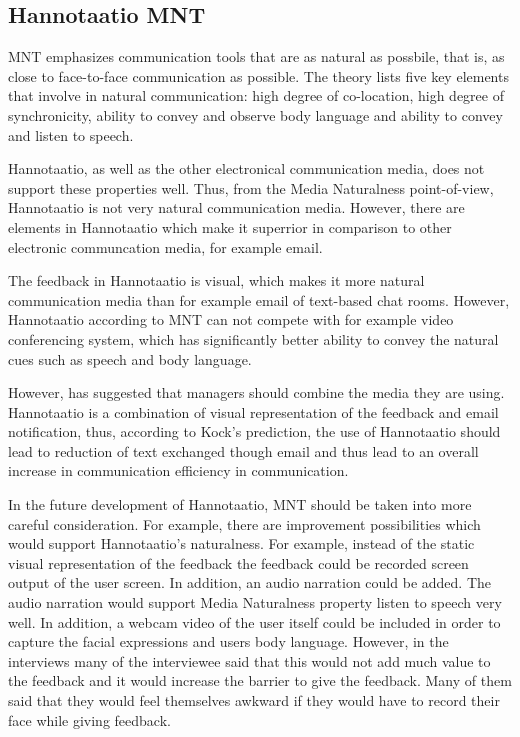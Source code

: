 \documentclass[english,12pt,a4paper,pdftex]{article}
\begin{document}
\subsection{Hannotaatio MNT}

\Ac{MNT} emphasizes communication tools that are as natural as possbile, that is, as close to face-to-face communication as possible. The theory lists five key elements that involve in natural communication: high degree of co-location, high degree of synchronicity, ability to convey and observe body language and ability to convey and listen to speech.

Hannotaatio, as well as the other electronical communication media, does not support these properties well. Thus, from the Media Naturalness point-of-view, Hannotaatio is not very natural communication media. However, there are elements in Hannotaatio which make it superrior in comparison to other electronic communcation media, for example email.

The feedback in Hannotaatio is visual, which makes it more natural communication media than for example email of text-based chat rooms. However, Hannotaatio according to \ac{MNT} can not compete with for example video conferencing system, which has significantly better ability to convey the natural cues such as speech and body language.

However, \citep{kock2007} has suggested that managers should combine the media they are using. Hannotaatio is a combination of visual representation of the feedback and email notification, thus, according to Kock's prediction, the use of Hannotaatio should lead to reduction of text exchanged though email and thus lead to an overall increase in communication efficiency in communication.

In the future development of Hannotaatio, \ac{MNT} should be taken into more careful consideration. For example, there are improvement possibilities which would support Hannotaatio's naturalness. For example, instead of the static visual representation of the feedback the feedback could be recorded screen output of the user screen. In addition, an audio narration could be added. The audio narration would support Media Naturalness property listen to speech very well. In addition, a webcam video of the user itself could be included in order to capture the facial expressions and users body language. However, in the interviews many of the interviewee said that this would not add much value to the feedback and it would increase the barrier to give the feedback. Many of them said that they would feel themselves awkward if they would have to record their face while giving feedback. 
\end{document}
